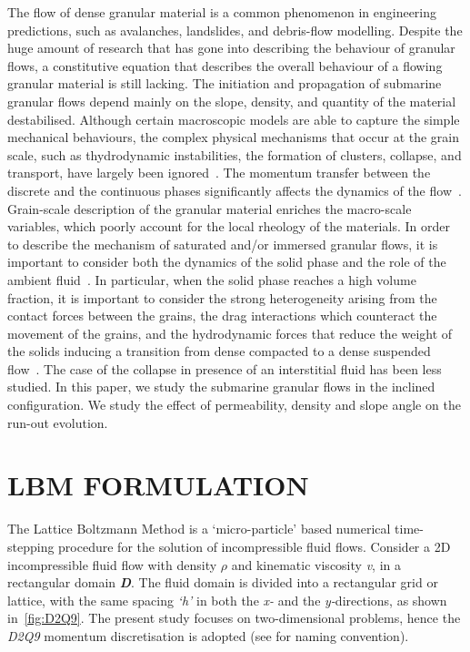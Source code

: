 \documentclass[12pt,a4paper,twocolumn,fleqn]{NARMS}
\begin{document}
The flow of dense granular material is a common phenomenon in engineering predictions, such as avalanches, landslides, and debris-flow modelling. Despite the huge amount of research that has gone into describing the behaviour of granular flows, a constitutive equation that describes the overall behaviour of a flowing granular material is still lacking. The initiation and propagation of submarine granular flows depend mainly on the slope, density, and quantity of the material destabilised. Although certain macroscopic models are able to capture the simple mechanical behaviours, the complex physical mechanisms that occur at the grain scale, such as thydrodynamic instabilities, the formation of clusters, collapse, and transport, have largely been ignored~. The momentum transfer between the discrete and the continuous phases significantly affects the dynamics of the flow~. Grain-scale description of the granular material enriches the macro-scale variables,  which poorly account for the local rheology of the materials.  In order to describe the mechanism of saturated and/or immersed granular flows, it is important to consider both the dynamics of the solid phase and the role of the ambient fluid~. In particular, when the solid phase reaches a high volume fraction, it is important to consider the strong heterogeneity arising from the contact forces between the grains, the drag interactions which counteract the movement of the grains, and the hydrodynamic forces that reduce the weight of the solids inducing a transition from dense compacted to a dense suspended flow~. The case of the collapse in presence of an interstitial fluid has been less studied. In this paper, we study the submarine granular flows in the inclined configuration. We study the effect of permeability, density and slope angle on the run-out evolution.
\section{LBM FORMULATION}

The Lattice Boltzmann Method is a `micro-particle' based numerical time-stepping procedure for the solution of incompressible fluid flows. Consider a 2D incompressible fluid flow with density $\rho$ and kinematic viscosity \textit{v}, in a rectangular domain \textit{\textbf{D}}. The fluid domain is divided into a rectangular grid or lattice, with the same spacing \textit{`h'} in both the \textit{x-} and the \textit{y-}directions, as shown in~\cref{fig:D2Q9}. The present study focuses on two-dimensional problems, hence the \textit{D2Q9} momentum discretisation is adopted (see  for naming convention).
\end{document}
